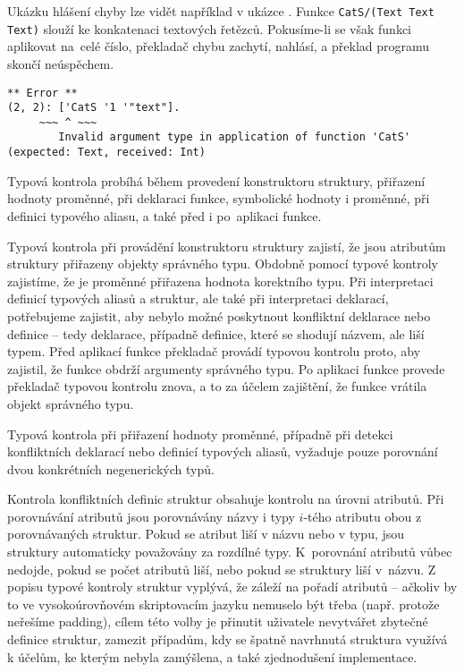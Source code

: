 Ukázku hlášení chyby lze vidět například v ukázce . Funkce
\lstinline{CatS/(Text Text Text)} slouží ke konkatenaci textových řetězců. Pokusíme-li
se však funkci aplikovat na~celé číslo, překladač chybu zachytí, nahlásí, a překlad programu skončí
neúspěchem.

\begin{lstlisting}[caption={Příklad hlášení chyby},label=type-error-reporting]
  ** Error **
(2, 2): ['CatS '1 '"text"].
     ~~~ ^ ~~~
        Invalid argument type in application of function 'CatS' (expected: Text, received: Int)
\end{lstlisting}

Typová kontrola probíhá během provedení konstruktoru struktury, přiřazení hodnoty proměnné, při
deklaraci funkce, symbolické hodnoty i proměnné, při definici typového aliasu, a také před i
po~aplikaci funkce.

Typová kontrola při provádění konstruktoru struktury zajistí, že jsou atributům struktury přiřazeny
objekty správného typu. Obdobně pomocí typové kontroly zajistíme, že je proměnné přiřazena hodnota
korektního typu. Při interpretaci definicí typových aliasů a struktur, ale také při interpretaci
deklarací, potřebujeme zajistit, aby nebylo možné poskytnout konfliktní deklarace nebo definice
-- tedy deklarace, případně definice, které se shodují názvem, ale liší typem. Před aplikací funkce
překladač provádí typovou kontrolu proto, aby zajistil, že funkce obdrží argumenty správného typu.
Po aplikaci funkce provede překladač typovou kontrolu znova, a to za účelem zajištění, že funkce
vrátila objekt správného typu.

Typová kontrola při přiřazení hodnoty proměnné, případně při detekci konfliktních deklarací nebo
definicí typových aliasů, vyžaduje pouze porovnání dvou konkrétních negenerických typů.

Kontrola konfliktních definic struktur obsahuje kontrolu na úrovni atributů. Při porovnávání
atributů jsou porovnávány názvy i typy $i$-tého atributu obou z porovnávaných struktur. Pokud se
atribut liší v názvu nebo v typu, jsou struktury automaticky považovány za rozdílné typy.
K~porovnání atributů vůbec nedojde, pokud se počet atributů liší, nebo pokud se struktury liší
v~názvu. Z popisu typové kontroly struktur vyplývá, že záleží na pořadí atributů -- ačkoliv by to
ve vysokoúrovňovém skriptovacím jazyku nemuselo být třeba (např. protože neřešíme padding), cílem
této volby je přinutit uživatele nevytvářet zbytečné definice struktur, zamezit případům, kdy
se špatně navrhnutá struktura využívá k účelům, ke kterým nebyla zamýšlena, a také zjednodušení
implementace.

